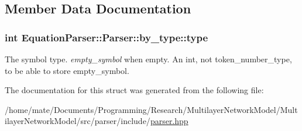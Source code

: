 \subsection{Member Data Documentation}
\subsubsection[{\texorpdfstring{type}{type}}]{\setlength{\rightskip}{0pt plus 5cm}int Equation\+Parser\+::\+Parser\+::by\+\_\+type\+::type}\hypertarget{structEquationParser_1_1Parser_1_1by__type_af116c7ee695735c0b9a2a6e74efa25f0}{}\label{structEquationParser_1_1Parser_1_1by__type_af116c7ee695735c0b9a2a6e74efa25f0}
The symbol type. {\itshape empty\+\_\+symbol} when empty. An int, not token\+\_\+number\+\_\+type, to be able to store empty\+\_\+symbol. 

The documentation for this struct was generated from the following file\+:\begin{DoxyCompactItemize}
\item 
/home/mate/\+Documents/\+Programming/\+Research/\+Multilayer\+Network\+Model/\+Multilayer\+Network\+Model/src/parser/include/\hyperlink{parser_8hpp}{parser.\+hpp}\end{DoxyCompactItemize}
